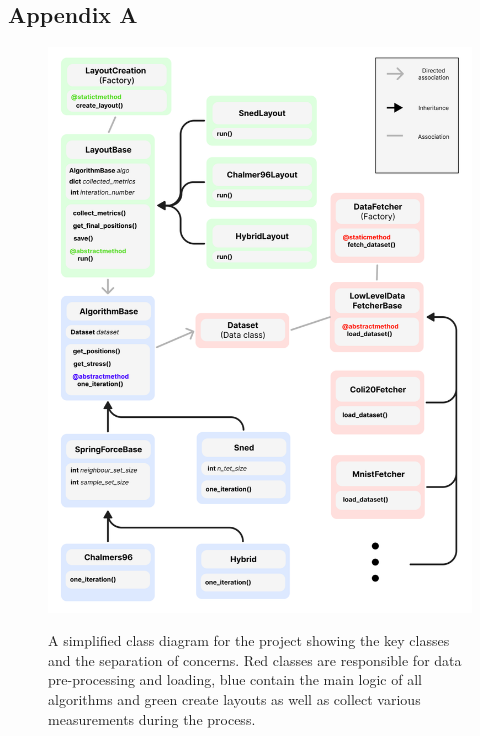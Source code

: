 \documentclass{l4proj}
\begin{document}
\begin{appendices}


\chapter{Appendix A}
\label{appendix a}

\begin{figure}[htb]
    \centering
    \includegraphics[width=1\linewidth]{images/class diag.png} \\
 
    \caption{A simplified class diagram for the project showing the key classes and the separation of concerns. Red classes are responsible for data pre-processing and loading, blue contain the main logic of all algorithms and green create layouts as well as collect various measurements during the process.
    }

    \label{fig:uml} 
\end{figure}


\end{appendices}
\end{document}
